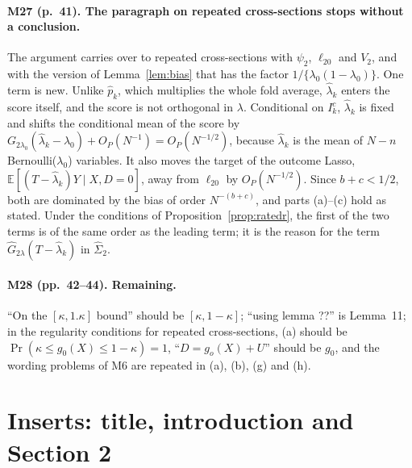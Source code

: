 \documentclass[11pt]{article}
\providecommand{\E}{\mathbb{E}}
\newenvironment{ins}{\begin{leftbar}}{\end{leftbar}}
\theoremstyle{plain}
\theoremstyle{remark}
\begin{document}
\paragraph{M27 (p.~41). The paragraph on repeated cross-sections stops without a conclusion.}
\begin{ins}
The argument carries over to repeated cross-sections with $\psi_2$, $\ell_{20}$
and $V_2$, and with the version of Lemma~\ref{lem:bias} that has the factor
$1/\{\lambda_0(1-\lambda_0)\}$. One term is new. Unlike $\hat p_k$, which
multiplies the whole fold average, $\hat\lambda_k$ enters the score itself, and
the score is not orthogonal in $\lambda$. Conditional on $I_k^c$, $\hat\lambda_k$
is fixed and shifts the conditional mean of the score by
$G_{2\lambda_0}(\hat\lambda_k-\lambda_0)+O_P(N^{-1})=O_P(N^{-1/2})$, because
$\hat\lambda_k$ is the mean of $N-n$ Bernoulli($\lambda_0$) variables. It also
moves the target of the outcome Lasso, $\E[(T-\hat\lambda_k)Y\mid X,D=0]$, away
from $\ell_{20}$ by $O_P(N^{-1/2})$. Since $b+c<1/2$, both are dominated by the
bias of order $N^{-(b+c)}$, and parts (a)--(c) hold as stated. Under the
conditions of Proposition~\ref{prop:ratedr}, the first of the two terms is of
the same order as the leading term; it is the reason for the term
$\hat G_{2\lambda}(T-\hat\lambda_k)$ in $\hat\Sigma_2$.
\end{ins}

\paragraph{M28 (pp.~42--44). Remaining.} ``On the $[\kappa,1.\kappa]$ bound''
should be $[\kappa,1-\kappa]$; ``using lemma ??'' is Lemma~11; in the regularity
conditions for repeated cross-sections, (a) should be
$\Pr(\kappa\le g_0(X)\le1-\kappa)=1$, ``$D=g_o(X)+U$'' should be $g_0$, and the
wording problems of M6 are repeated in (a), (b), (g) and (h).

\section{Inserts: title, introduction and Section 2}\label{sec:front}
\end{document}
